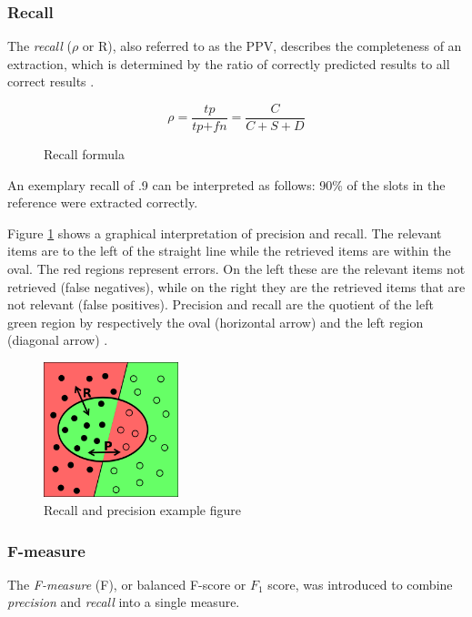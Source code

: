 \subsubsection{Recall}
The \textit{recall} (\ensuremath{\rho} or R), also referred to as the \gls{PPV}, describes the completeness of an extraction, which is determined by the ratio of correctly predicted results to all correct results \cite{Carstensen:2010}.

\begin{figure}[H]
\begin{displaymath}
	\rho = \frac{\textit{tp}}{\textit{tp} + \textit{fn}} = \frac{C}{C+S+D}
\end{displaymath}
\caption{Recall formula}
\end{figure}

An exemplary recall of .9 can be interpreted as follows: 90\% of the slots in the reference were extracted correctly.

Figure \ref{fig:recall-precision} shows a graphical interpretation of precision and recall. The relevant items are to the left of the straight line while the retrieved items are within the oval. The red regions represent errors. On the left these are the relevant items not retrieved (false negatives), while on the right they are the retrieved items that are not relevant (false positives). Precision and recall are the quotient of the left green region by respectively the oval (horizontal arrow) and the left region (diagonal arrow) \cite{Wikipedia:Precision_and_recall}.

\begin{figure}[H]
\centering
\includegraphics[width=0.35\textwidth]{recall-precision.png}
\caption{Recall and precision example figure \cite{Wikipedia:Precision_and_recall}}
\label{fig:recall-precision}
\end{figure}

\subsubsection{F-measure}
The \textit{F-measure} (F), or  balanced F-score or $\textit{F}_\textit{1}$ score, was introduced to combine \textit{precision} and \textit{recall} into a single measure.

